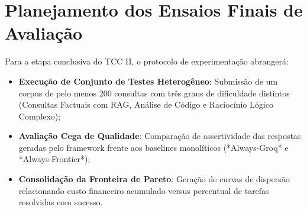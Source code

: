 \section{Planejamento dos Ensaios Finais de Avaliação}

Para a etapa conclusiva do TCC II, o protocolo de experimentação abrangerá:

\begin{itemize}
    \item \textbf{Execução de Conjunto de Testes Heterogêneo}: Submissão de um corpus de pelo menos 200 consultas com três graus de dificuldade distintos (Consultas Factuais com RAG, Análise de Código e Raciocínio Lógico Complexo);
    \item \textbf{Avaliação Cega de Qualidade}: Comparação de assertividade das respostas geradas pelo framework frente aos baselines monolíticos (*Always-Groq* e *Always-Frontier*);
    \item \textbf{Consolidação da Fronteira de Pareto}: Geração de curvas de dispersão relacionando custo financeiro acumulado versus percentual de tarefas resolvidas com sucesso.
\end{itemize}
